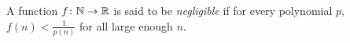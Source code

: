 
\begin{definition*}[Negligibility] \label{def:negl}
    A function $f\colon \mathbb{N} \to \mathbb{R}$ is said to be \emph{negligible} if
    for every polynomial $p$,
    $f(n) < \frac1{p(n)}$ for all large enough $n$.
\end{definition*}
